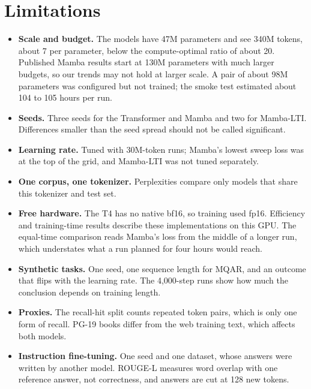 \documentclass[conference]{IEEEtran}
\begin{document}
\section{Limitations}
\begin{itemize}
  \item \textbf{Scale and budget.} The models have 47M parameters and see 340M tokens, about 7 per
        parameter, below the compute-optimal ratio of about 20. Published Mamba results start at 130M
        parameters with much larger budgets, so our trends may not hold at larger scale. A pair of about
        98M parameters was configured but not trained; the smoke test estimated about 104 to 105 hours
        per run.
  \item \textbf{Seeds.} Three seeds for the Transformer and Mamba and two for Mamba-LTI. Differences
        smaller than the seed spread should not be called significant.
  \item \textbf{Learning rate.} Tuned with 30M-token runs; Mamba's lowest sweep loss was at the top of
        the grid, and Mamba-LTI was not tuned separately.
  \item \textbf{One corpus, one tokenizer.} Perplexities compare only models that share this tokenizer
        and test set.
  \item \textbf{Free hardware.} The T4 has no native bf16, so training used fp16. Efficiency and
        training-time results describe these implementations on this GPU. The equal-time comparison
        reads Mamba's loss from the middle of a longer run, which understates what a run planned for
        four hours would reach.
  \item \textbf{Synthetic tasks.} One seed, one sequence length for MQAR, and an outcome that flips
        with the learning rate. The 4,000-step runs show how much the conclusion depends on training
        length.
  \item \textbf{Proxies.} The recall-hit split counts repeated token pairs, which is only one form of
        recall. PG-19 books differ from the web training text, which affects both models.
  \item \textbf{Instruction fine-tuning.} One seed and one dataset, whose answers were written by
        another model. ROUGE-L measures word overlap with one reference answer, not correctness, and
        answers are cut at 128 new tokens.
\end{itemize}
\end{document}
